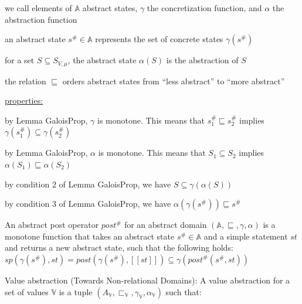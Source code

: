 \documentclass[landscape, a4paper]{article}
\begin{document}
\begin{minipage}[t]{0.2\linewidth}
\begin{betterlist}
\begin{betterlist}
\begin{betterlist}
				\item we call elements of $\mathbb{A}$ \alert{abstract states}, $\gamma$ the \alert{concretization function}, and $\alpha$ the \alert{abstraction function}
				\item an abstract state $s^\# \in \mathbb{A}$ represents the set of concrete states $\gamma(s^\#)$
				\item for a set $S \subseteq S_{V,\mu}$, the abstract state $\alpha(S)$ is the abstraction of $S$
				\item the relation $\sqsubseteq$ orders abstract states from \enquote{less abstract} to \enquote{more abstract}
				\item \underline{properties:}
				\begin{betterlist}
					\item by Lemma GaloisProp, $\gamma$ is monotone. This means that $s^\#_1 \sqsubseteq s^\#_2$ implies $\gamma(s^\#_1) \subseteq \gamma(s^\#_2)$
					\item by Lemma GaloisProp, $\alpha$ is monotone. This means that $S_1 \subseteq S_2$ implies $\alpha(S_1) \sqsubseteq \alpha(S_2)$
					\item by condition $2$ of Lemma GaloisProp, we have $S \subseteq \gamma(\alpha(S))$
					\item by condition $3$ of Lemma GaloisProp, we have $\alpha(\gamma(s^\#)) \sqsubseteq s^\#$
				\end{betterlist}
			\end{betterlist}
			\item {}
		\end{betterlist}\color{black}
		\item \color{violet}An \alert{abstract post operator} $post^\#$ for an abstract domain $(\mathbb{A}, \sqsubseteq, \gamma, \alpha)$ is a monotone function that takes an abstract state $s^\# \in \mathbb{A}$ and a simple statement $st$ and returns a new abstract state, such that the following holds: $sp(\gamma(s^\#), st) = post(\gamma(s^\#), [[st]]) \subseteq \gamma(post^\#(s^\#, st))$\color{black}
		\begin{betterlist}
			\item {}
			\item {}
		\end{betterlist}
		\item \color{orange}\alert{Value abstraction (Towards Non-relational Domains):} A value abstraction for a set of values $\mathbb{V}$ is a tuple $(A_{\mathbb{V}}, \sqsubset_{\mathbb{V}}, \gamma_{\mathbb{V}}, \alpha_{\mathbb{V}})$ such that:

\end{betterlist}
\end{minipage}
\end{document}
